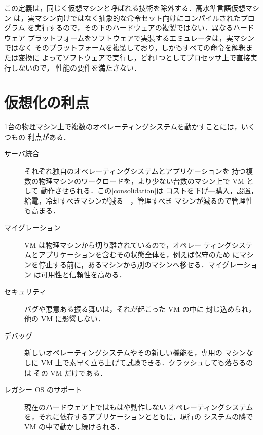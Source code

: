 \documentclass[../main.tex]{subfiles}
\begin{document}
\begin{note}
  この定義は，同じく仮想マシンと呼ばれる技術を除外する．高水準言語仮想マシン
  は，実マシン向けではなく抽象的な命令セット向けにコンパイルされたプログラム
  を実行するので，その下のハードウェアの複製ではない．異なるハードウェア
  プラットフォームをソフトウェアで実装するエミュレータは，実マシンではなく
  そのプラットフォームを複製しており，しかもすべての命令を解釈または変換に
  よってソフトウェアで実行し，どれ1つとしてプロセッサ上で直接実行しないので，
  性能の要件を満たさない．
\end{note}

\section{仮想化の利点}
\label{sec:l12-benefits}

1台の物理マシン上で複数のオペレーティングシステムを動かすことには，いくつもの
利点がある．
\begin{description}
  \item[サーバ統合] それぞれ独自のオペレーティングシステムとアプリケーションを
    持つ複数の物理マシンのワークロードを，より少ない台数のマシン上で VM として
    動作させられる．この[consolidation]は
    コストを下げ---購入，設置，給電，冷却すべきマシンが減る---，管理すべき
    マシンが減るので管理性も高まる．
  \item[マイグレーション] VM は物理マシンから切り離されているので，オペレー
    ティングシステムとアプリケーションを含むその状態全体を，例えば保守のため
    にマシンを停止する前に，あるマシンから別のマシンへ移せる．マイグレーション
    は可用性と信頼性を高める．
  \item[セキュリティ] バグや悪意ある振る舞いは，それが起こった VM の中に
    封じ込められ，他の VM に影響しない．
  \item[デバッグ] 新しいオペレーティングシステムやその新しい機能を，専用の
    マシンなしに VM 上で素早く立ち上げて試験できる．クラッシュしても落ちるのは
    その VM だけである．
  \item[レガシー OS のサポート] 現在のハードウェア上ではもはや動作しない
    オペレーティングシステムを，それに依存するアプリケーションとともに，現行の
    システムの隣で VM の中で動かし続けられる．
\end{description}
\end{document}
